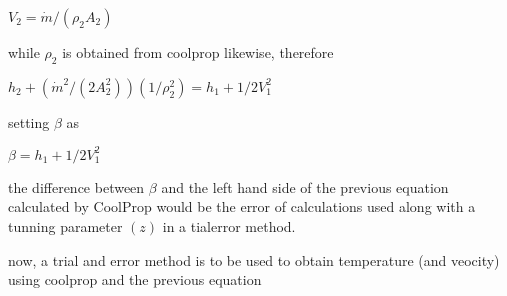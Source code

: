 \documentclass[letterpaper,10pt,english]{jupyterBook}
\begin{document}
\sphinxAtStartPar
\(V_2=\dot m/(\rho_2A_2)\)

\sphinxAtStartPar
while \(\rho_2\) is obtained from coolprop likewise, therefore

\sphinxAtStartPar
\(h_2+(\dot m^2/(2A_2^2))(1/\rho_2^2)=h_1+1/2V_1^2\)

\sphinxAtStartPar
setting \(\beta\) as

\sphinxAtStartPar
\(\beta=h_1+1/2V_1^2\)

\sphinxAtStartPar
the difference between \(\beta\) and the left hand side of the previous equation calculated by CoolProp would be the error of calculations used along with a tunning parameter \((z)\) in a tial\sphinxhyphen{}error method.

\sphinxAtStartPar
now, a trial and error method is to be used to obtain temperature (and veocity) using coolprop and the previous equation
\end{document}
